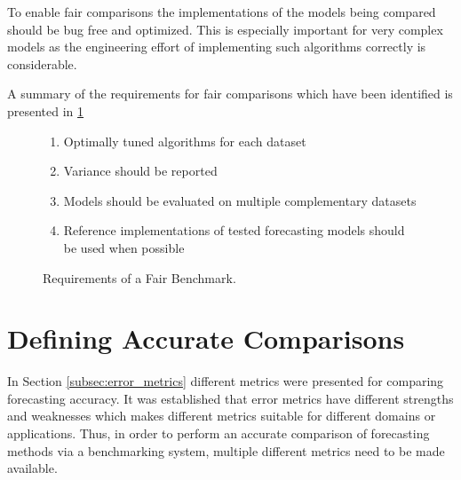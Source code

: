To enable fair comparisons the implementations of the models being compared should be bug free and optimized. This is especially important for very complex models as the engineering effort of implementing such algorithms correctly is considerable.

A summary of the requirements for fair comparisons which have been identified is presented in \ref{fig:fair_requirements}
\begin{figure}[h]
  \begin{enumerate}
    \item Optimally tuned algorithms for each dataset
    \item Variance should be reported
    \item Models should be evaluated on multiple complementary datasets
    \item Reference implementations of tested forecasting models should be used when possible
  \end{enumerate}
  \caption{Requirements of a Fair Benchmark.}
  \label{fig:fair_requirements}
\end{figure}

\section{Defining Accurate Comparisons}
In Section \ref{subsec:error_metrics} different metrics were presented for comparing forecasting accuracy. It was established that error metrics have different strengths and weaknesses which makes different metrics suitable for different domains or applications.
Thus, in order to perform an accurate comparison of forecasting methods via a benchmarking system, multiple different metrics need to be made available.

